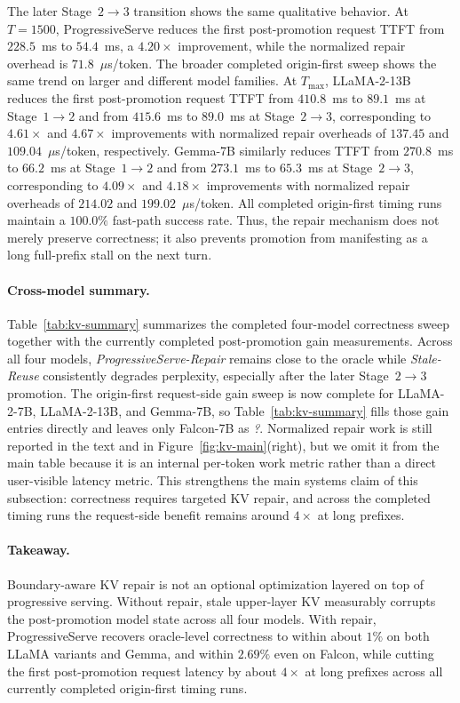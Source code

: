 The later Stage~\(2\!\rightarrow\!3\) transition shows the same qualitative behavior.
At \(T{=}1500\), ProgressiveServe reduces the first post-promotion request TTFT from \(228.5\)~ms to \(54.4\)~ms, a \(4.20\times\) improvement, while the normalized repair overhead is \(71.8\)~\(\mu\)s/token.
The broader completed origin-first sweep shows the same trend on larger and different model families.
At \(T_{\max}\), LLaMA-2-13B reduces the first post-promotion request TTFT from \(410.8\)~ms to \(89.1\)~ms at Stage~\(1\!\rightarrow\!2\) and from \(415.6\)~ms to \(89.0\)~ms at Stage~\(2\!\rightarrow\!3\), corresponding to \(4.61\times\) and \(4.67\times\) improvements with normalized repair overheads of \(137.45\) and \(109.04\)~\(\mu\)s/token, respectively.
Gemma-7B similarly reduces TTFT from \(270.8\)~ms to \(66.2\)~ms at Stage~\(1\!\rightarrow\!2\) and from \(273.1\)~ms to \(65.3\)~ms at Stage~\(2\!\rightarrow\!3\), corresponding to \(4.09\times\) and \(4.18\times\) improvements with normalized repair overheads of \(214.02\) and \(199.02\)~\(\mu\)s/token.
All completed origin-first timing runs maintain a \(100.0\%\) fast-path success rate.
Thus, the repair mechanism does not merely preserve correctness; it also prevents promotion from manifesting as a long full-prefix stall on the next turn.

\paragraph{Cross-model summary.}
Table~\ref{tab:kv-summary} summarizes the completed four-model correctness sweep together with the currently completed post-promotion gain measurements.
Across all four models, \textit{ProgressiveServe-Repair} remains close to the oracle while \textit{Stale-Reuse} consistently degrades perplexity, especially after the later Stage~\(2\!\rightarrow\!3\) promotion.
The origin-first request-side gain sweep is now complete for LLaMA-2-7B, LLaMA-2-13B, and Gemma-7B, so Table~\ref{tab:kv-summary} fills those gain entries directly and leaves only Falcon-7B as \textit{?}.
Normalized repair work is still reported in the text and in Figure~\ref{fig:kv-main}(right), but we omit it from the main table because it is an internal per-token work metric rather than a direct user-visible latency metric.
This strengthens the main systems claim of this subsection: correctness requires targeted KV repair, and across the completed timing runs the request-side benefit remains around \(4\times\) at long prefixes.

\paragraph{Takeaway.}
Boundary-aware KV repair is not an optional optimization layered on top of progressive serving.
Without repair, stale upper-layer KV measurably corrupts the post-promotion model state across all four models.
With repair, ProgressiveServe recovers oracle-level correctness to within about \(1\%\) on both LLaMA variants and Gemma, and within \(2.69\%\) even on Falcon, while cutting the first post-promotion request latency by about \(4\times\) at long prefixes across all currently completed origin-first timing runs.

